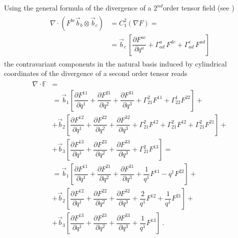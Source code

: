 \documentclass[letterpaper,10pt,english]{jupyterBook}
\begin{document}
\sphinxAtStartPar
Using the general formula of the divergence of a \(2^{nd}\)\sphinxhyphen{}order tensor field (see {\hyperref[\detokenize{ch/tensor-algebra-calculus/calculus-euclidean:tensor-calculus-differential-operators-divergence}]{}})
\begin{equation*}
\begin{split}\begin{aligned}
  \nabla \cdot \left( F^{bc} \vec{b}_b \otimes \vec{b}_c \right)
  & = C_{1}^{2} \left( \nabla F \right) = \\
  & = \vec{b}_c \, \left[ \dfrac{\partial F^{ac}}{\partial q^a} + \Gamma_{ad}^a \, F^{dc} + \Gamma^{c}_{ad} \, F^{ad}  \right] 
\end{aligned}\end{split}
\end{equation*}
\sphinxAtStartPar
the contravariant components in the natural basis induced by cylindrical coordinates of the divergence of a second order tensor reads
\begin{equation*}
\begin{split}\begin{aligned}
  \nabla \cdot \mathbb{F} & = \\
  & = \vec{b}_1 \left[ \dfrac{\partial F^{11}}{\partial q^{1}} + \dfrac{\partial F^{21}}{\partial q^{2}} + \dfrac{\partial F^{31}}{\partial q^{3}} + \Gamma_{21}^{2} F^{11} + \Gamma_{22}^{1} F^{22}  \right] + \\
  & + \vec{b}_2 \left[ \dfrac{\partial F^{12}}{\partial q^{1}} + \dfrac{\partial F^{22}}{\partial q^{2}} + \dfrac{\partial F^{32}}{\partial q^{3}} + \Gamma_{21}^{2} F^{12} + \Gamma_{21}^{2} F^{12} + \Gamma_{21}^2 F^{21} \right] + \\
  & + \vec{b}_3 \left[ \dfrac{\partial F^{13}}{\partial q^{1}} + \dfrac{\partial F^{23}}{\partial q^{2}} + \dfrac{\partial F^{33}}{\partial q^{3}} + \Gamma_{21}^{2} F^{13} \right] = \\
  & = \vec{b}_1 \left[ \dfrac{\partial F^{11}}{\partial q^{1}} + \dfrac{\partial F^{21}}{\partial q^{2}} + \dfrac{\partial F^{31}}{\partial q^{3}} + \dfrac{1}{q^1} F^{11} - q^{1} F^{22}  \right] + \\
  & + \vec{b}_2 \left[ \dfrac{\partial F^{12}}{\partial q^{1}} + \dfrac{\partial F^{22}}{\partial q^{2}} + \dfrac{\partial F^{32}}{\partial q^{3}} + \dfrac{2}{q^1} F^{12} + \dfrac{1}{q^1} F^{21} \right] + \\
  & + \vec{b}_3 \left[ \dfrac{\partial F^{13}}{\partial q^{1}} + \dfrac{\partial F^{23}}{\partial q^{2}} + \dfrac{\partial F^{33}}{\partial q^{3}} + \dfrac{1}{q^1} F^{13} \right] \ .
\end{aligned}\end{split}
\end{equation*}
\end{document}
